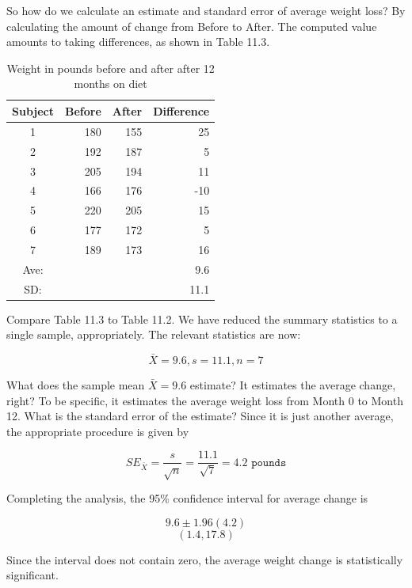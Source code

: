\documentclass[11pt, chapterprefix=true]{scrbook}\usepackage[]{graphicx}\usepackage[]{color}
\begin{document}
So how do we calculate an estimate and standard error of average weight loss?  
By calculating the amount of change from Before to After.  The computed value amounts to taking differences, as shown in Table 11.3.

\begin{table}[ht]
\centering
\caption{Weight in pounds before and after after 12 months on diet}
\begin{tabular}{@{} crrr @{}} \hline
Subject & Before & After & Difference \\ \hline
1 & 180 & 155 & 25 \\
2 & 192 & 187 & 5 \\
3 & 205 & 194 & 11 \\
4 & 166 & 176 & -10 \\
5 & 220 & 205 & 15 \\
6 & 177 & 172 & 5 \\
7 & 189 & 173 & 16 \\ \hline
Ave: &  &  & 9.6 \\
SD:  &  & & 11.1 \\ \hline
\end{tabular}
\end{table}

Compare Table 11.3 to Table 11.2.  We have reduced the summary statistics to a single sample, appropriately.  The relevant statistics are now:

$$ \bar{X} = 9.6,  s = 11.1,  n= 7 $$

What does the sample mean $\bar{X} = 9.6$ estimate?  It estimates the average change, right?  To be specific, it estimates the average weight loss from Month 0 to Month 12.  What is the standard error of the estimate?  Since it is just another average, the appropriate procedure is given by 

\begin{equation*}
SE_{\bar{X}} = \frac{s}{\sqrt{n}} = \frac{11.1}{\sqrt{7}} = 4.2 \texttt{ pounds}
\end{equation*}

Completing the analysis, the 95\% confidence interval for average change is

\begin{equation*}
9.6 \pm 1.96 (4.2)
\end{equation*}
\begin{equation*}
(1.4, 17.8)
\end{equation*}

Since the interval does not contain zero, the average weight change is statistically significant.
\end{document}
